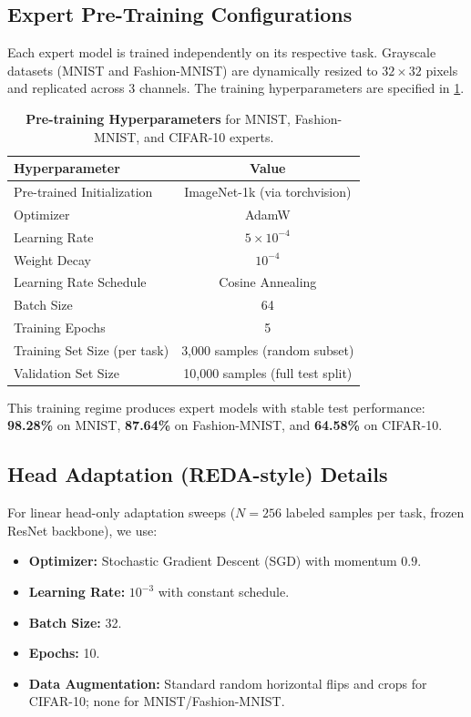 \documentclass{article}
\begin{document}
\subsection{Expert Pre-Training Configurations}
Each expert model is trained independently on its respective task. Grayscale datasets (MNIST and Fashion-MNIST) are dynamically resized to $32 \times 32$ pixels and replicated across 3 channels. The training hyperparameters are specified in \cref{tab:hyperparameters}.

\begin{table}[H]
\caption{\textbf{Pre-training Hyperparameters} for MNIST, Fashion-MNIST, and CIFAR-10 experts.}
\label{tab:hyperparameters}
\begin{center}
\begin{tabular}{lc}
\toprule
\textbf{Hyperparameter} & \textbf{Value} \\
\midrule
Pre-trained Initialization & ImageNet-1k (via torchvision) \\
Optimizer & AdamW \\
Learning Rate & $5 \times 10^{-4}$ \\
Weight Decay & $10^{-4}$ \\
Learning Rate Schedule & Cosine Annealing \\
Batch Size & 64 \\
Training Epochs & 5 \\
Training Set Size (per task) & 3,000 samples (random subset) \\
Validation Set Size & 10,000 samples (full test split) \\
\bottomrule
\end{tabular}
\end{center}
\end{table}

This training regime produces expert models with stable test performance: \textbf{98.28\%} on MNIST, \textbf{87.64\%} on Fashion-MNIST, and \textbf{64.58\%} on CIFAR-10.

\subsection{Head Adaptation (REDA-style) Details}
For linear head-only adaptation sweeps ($N=256$ labeled samples per task, frozen ResNet backbone), we use:
\begin{itemize}
    \item \textbf{Optimizer:} Stochastic Gradient Descent (SGD) with momentum $0.9$.
    \item \textbf{Learning Rate:} $10^{-3}$ with constant schedule.
    \item \textbf{Batch Size:} 32.
    \item \textbf{Epochs:} 10.
    \item \textbf{Data Augmentation:} Standard random horizontal flips and crops for CIFAR-10; none for MNIST/Fashion-MNIST.
\end{itemize}
\end{document}
